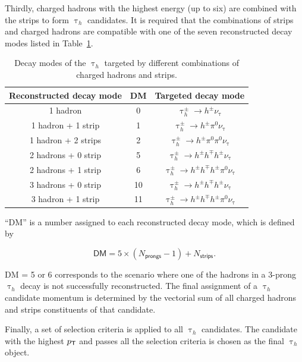 Thirdly, charged hadrons with the highest energy (up to six) are combined with the strips to form $\uptau_h$ candidates. It is required that the combinations of strips and charged hadrons are compatible with one of the seven reconstructed decay modes listed in Table~\ref{tab:DM}.

\begin{table}[th]
\sffamily
\centering
\caption{Decay modes of the $\uptau_h$ targeted by different combinations of charged hadrons and strips.}
\begin{tabular}{ccc}
\toprule
Reconstructed decay mode & DM & Targeted decay mode \\
\midrule
1 hadron & 0 & $\uptau_{h}^{\pm}\rightarrow h^{\pm}\nu_{\uptau} $\\
1 hadron + 1 strip & 1 & $\uptau_{h}^{\pm}\rightarrow h^{\pm}\pi^{0}\nu_{\uptau} $\\
1 hadron + 2 strips & 2 & $\uptau_{h}^{\pm}\rightarrow h^{\pm}\pi^{0}\pi^{0}\nu_{\uptau} $\\
2 hadrons + 0 strip & 5 & $\uptau_{h}^{\pm}\rightarrow h^{\pm}h^{\mp}h^{\pm}\nu_{\uptau} $\\
2 hadrons + 1 strip & 6 & $\uptau_{h}^{\pm}\rightarrow h^{\pm}h^{\mp}h^{\pm}\pi^{0}\nu_{\uptau} $\\
3 hadrons + 0 strip & 10 & $\uptau_{h}^{\pm}\rightarrow h^{\pm}h^{\mp}h^{\pm}\nu_{\uptau} $\\
3 hadron + 1 strip & 11 & $\uptau_{h}^{\pm}\rightarrow h^{\pm}h^{\mp}h^{\pm}\pi^{0}\nu_{\uptau} $\\
\bottomrule
\end{tabular}
\label{tab:DM}
\end{table}

``DM'' is a number assigned to each reconstructed decay mode, which is defined by 

\begin{equation}
\textsf{DM} = 5\times(N_{\textsf{prongs}}-1)+N_{\textsf{strips}}.
\end{equation}

DM = 5 or 6 corresponds to the scenario where one of the hadrons in a 3-prong $\uptau_h$ decay is not successfully reconstructed. The final assignment of a $\uptau_h$ candidate momentum is determined by the vectorial sum of all charged hadrons and strips constituents of that candidate. 

Finally, a set of selection criteria is applied to all $\uptau_h$ candidates. The candidate with the highest $p_{\textsf{T}}$ and passes all the selection criteria is chosen as the final $\uptau_h$ object. 

